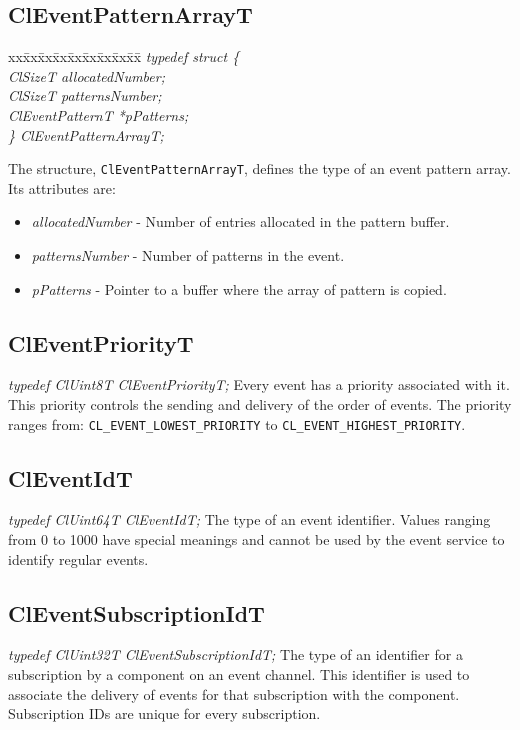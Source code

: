 \begin{flushleft}
\subsection{ClEventPatternArrayT}
\begin{tabbing}
xx\=xx\=xx\=xx\=xx\=xx\=xx\=xx\=xx\=\kill
\textit{typedef struct \{}\\
\>\>\>\>\textit{ClSizeT allocatedNumber;}\\
\>\>\>\>\textit{ClSizeT patternsNumber;}\\
\>\>\>\>\textit{ClEventPatternT *pPatterns;}\\
\textit{\} ClEventPatternArrayT;}\end{tabbing}
The structure, {\tt{ClEventPatternArrayT}}, defines the type of an event pattern array. Its attributes are:
\begin{itemize}
\item
\textit{allocatedNumber} - Number of entries allocated in the pattern buffer.
\item
\textit{patternsNumber} - Number of patterns in the event.
\item
\textit{pPatterns} - Pointer to a buffer where the array of pattern is copied.
\end{itemize}


\subsection{ClEventPriorityT}
\textit{typedef ClUint8T ClEventPriorityT;}
\newline
\newline
Every event has a priority associated with it. This priority controls the sending and delivery of the order of events. The priority ranges from: 
{\tt{CL\_\-EVENT\_\-LOWEST\_\-PRIORITY}} to {\tt{CL\_\-EVENT\_\-HIGHEST\_\-PRIORITY}}. 

\subsection{ClEventIdT}
\textit{typedef ClUint64T ClEventIdT;}
\newline
\newline
 The type of an event identifier. Values ranging from 0 to 1000 have special meanings
 and cannot be used by the event service to identify regular events.

    
\subsection{ClEventSubscriptionIdT}
\textit{typedef ClUint32T ClEventSubscriptionIdT;}
\newline
\newline
The type of an identifier for a subscription by a component on an event channel. This identifier is used to associate the delivery
of events for that subscription with the component. Subscription IDs are unique for every subscription.



\end{flushleft}

